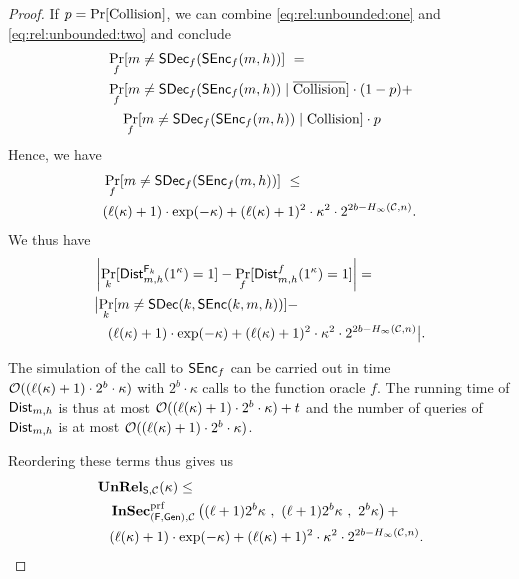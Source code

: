 \begin{proof}
      If $p=\Pr[\operatorname{Collision}]$, we can combine
      \eqref{eq:rel:unbounded:one} and \eqref{eq:rel:unbounded:two} and conclude
      \begin{align*}
        &\Pr_{f}[m\neq \operatorname{\mathsf{SDec}}_{f}(\operatorname{\mathsf{SEnc}}_{f}(m,h))]\ =\\
        &\Pr_{f}[m\neq \operatorname{\mathsf{SDec}}_{f}(\operatorname{\mathsf{SEnc}}_{f}(m,h))\mid
        \overline{\operatorname{Collision}}]\cdot (1-p)
        +\\
        &\quad\Pr_{f}[m\neq \operatorname{\mathsf{SDec}}_{f}(\operatorname{\mathsf{SEnc}}_{f}(m,h))\mid
        \operatorname{Collision}]\cdot p
      \end{align*}
      Hence, we have
      \begin{align*}
        &\Pr_{f}[m\neq \operatorname{\mathsf{SDec}}_{f}(\operatorname{\mathsf{SEnc}}_{f}(m,h))]\ \leq\\
        &(\ell(\kappa)+1)\cdot \exp(-\kappa)+(\ell(\kappa)+1)^{2}\cdot \kappa^{2}\cdot
          2^{2b-H_{\infty}(\mathcal{C},n)}.
      \end{align*}
      We thus have
      \begin{align*}
        &\left|\Pr_{k}[\operatorname{\mathsf{Dist}}_{m,h}^{\operatorname{\mathsf{F}}_{k}}(1^{\kappa})=1] -
          \Pr_{f}[\operatorname{\mathsf{Dist}}_{m,h}^{f}(1^{\kappa})=1]\right|=\\
        &\bigl|\Pr_{k}[m\neq
          \operatorname{\mathsf{SDec}}(k,\operatorname{\mathsf{SEnc}}(k,m,h))]-\\
        &\quad (\ell(\kappa)+1)\cdot
          \exp(-\kappa)+(\ell(\kappa)+1)^{2}\cdot 
          \kappa^{2}\cdot 2^{2b-H_{\infty}(\mathcal{C},n)}\bigl|.
      \end{align*}

      The simulation of the call to $\operatorname{\mathsf{SEnc}}_{f}$ can be carried out in
      time $\mathcal{O}((\ell(\kappa)+1)\cdot 2^{b}\cdot \kappa)$ with
      $2^{b}\cdot \kappa$ calls to the function oracle $f$. The running
      time of $\operatorname{\mathsf{Dist}}_{m,h}$ is thus at most
      $\mathcal{O}((\ell(\kappa)+1)\cdot 2^{b}\cdot \kappa)+t$ and the
      number of queries of $\operatorname{\mathsf{Dist}}_{m,h}$ is at most
      $\mathcal{O}((\ell(\kappa)+1)\cdot 2^{b}\cdot \kappa)$.

      Reordering these terms thus gives us
      \begin{align*}
        &\unrel_{\Steg,\chan}(\kappa) \leq\\
       &\quad
         \InSec^{\prf}_{(\algf,\Gen),\chan}\left((\ell+1)2^{b}\kappa\ ,\ (\ell+1)2^{b}
        \kappa\ ,\ 2^{b}\kappa\right)+\\
      &\quad  (\ell(\kappa)+1)\cdot \exp(-\kappa)+(\ell(\kappa)+1)^{2} \cdot
        \kappa^{2}\cdot  2^{2b-\minent(\chan,n)}.
      \end{align*}
\end{proof}


